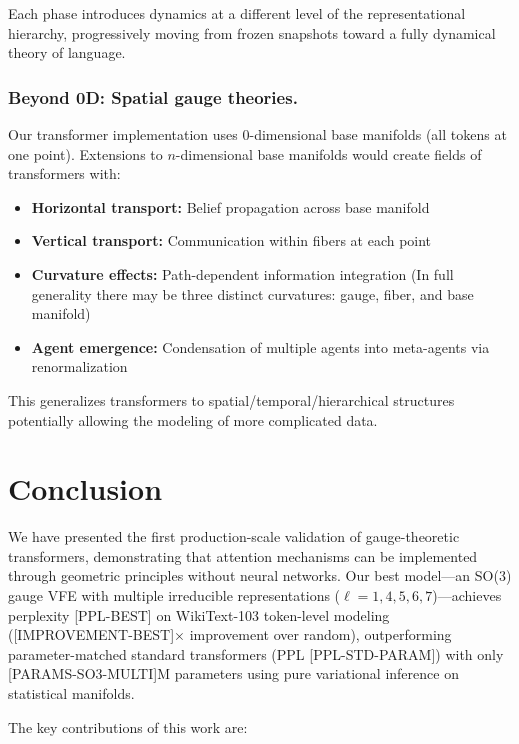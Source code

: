 \documentclass[twoside,11pt]{article}
\begin{document}
Each phase introduces dynamics at a different level of the representational hierarchy, progressively moving from frozen snapshots toward a fully dynamical theory of language.


\subsubsection{Beyond 0D: Spatial gauge theories.}
\label{sec:beyond_0d} 

Our transformer implementation uses 0-dimensional base manifolds (all tokens at one point). Extensions to $n$-dimensional base manifolds would create fields of transformers with:

\begin{itemize}
\item \textbf{Horizontal transport:} Belief propagation across base manifold
\item \textbf{Vertical transport:} Communication within fibers at each point
\item \textbf{Curvature effects:} Path-dependent information integration (In full generality there may be three distinct curvatures: gauge, fiber, and base manifold)
\item \textbf{Agent emergence:} Condensation of multiple agents into meta-agents via renormalization
\end{itemize}

This generalizes transformers to spatial/temporal/hierarchical structures potentially allowing the modeling of more complicated data.

\section{Conclusion}

We have presented the first production-scale validation of gauge-theoretic transformers, demonstrating that attention mechanisms can be implemented through geometric principles without neural networks. Our best model---an SO(3) gauge VFE with multiple irreducible representations ($\ell=1,4,5,6,7$)---achieves perplexity [PPL-BEST] on WikiText-103 token-level modeling ([IMPROVEMENT-BEST]$\times$ improvement over random), outperforming parameter-matched standard transformers (PPL [PPL-STD-PARAM]) with only [PARAMS-SO3-MULTI]M parameters using pure variational inference on statistical manifolds.

The key contributions of this work are:
\end{document}
